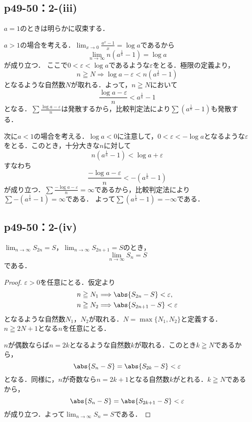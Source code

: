 \documentclass[a4paper,10pt,fleqn]{ltjsarticle}
\begin{document}
    \subsection*{p49-50：2-(iii)}

	\begin{screen}
        $a=1$のときは明らかに収束する．
  
        $a>1$の場合を考える．$\lim_{x \to 0} \frac{a^x-1}{x} = \log a$であるから
        \[
        \lim_{n \to \infty} n(a^{\frac{1}{n}}-1) = \log a
        \]
        が成り立つ．
        ここで$0 < \varepsilon <\log a$であるような$\varepsilon$をとる．極限の定義より，
        \[
         n \geqq N \Longrightarrow \log a - \varepsilon < n (a^\frac{1}{n}-1)
        \]
        となるような自然数$N$が取れる．よって，$n \geqq N$において
        \[
            \frac{\log a - \varepsilon}{n} < a^\frac{1}{n}-1
        \]
        となる．$\sum \frac{\log a - \varepsilon}{n}$は発散するから，比較判定法により$\sum (a^{\frac{1}{n}}-1)$も発散する．

        次に$ a<1$の場合を考える．$\log a <0$に注意して，$0 < \varepsilon <-\log a $となるような$\varepsilon$をとる．このとき，十分大きな$n$に対して
        \[
        n (a^\frac{1}{n}-1) < \log a + \varepsilon
        \]
        すなわち
        \[
        \frac{-\log a - \varepsilon}{n} < -(a^\frac{1}{n}-1)
        \]
        が成り立つ．$\sum \frac{-\log a - \varepsilon}{n}=\infty$であるから，比較判定法により$\sum -(a^{\frac{1}{n}}-1)=\infty$である．
        よって$\sum (a^{\frac{1}{n}}-1)=-\infty$である．
	\end{screen}


    \subsection*{p49-50：2-(iv)}


    $\lim_{n \to \infty} S_{2n}=S$，$\lim_{n \to \infty} S_{2n+1}=S$のとき，
    \[
    \lim_{n \to \infty} S_n = S
    \]
    である．

    \begin{proof}
    $\varepsilon >0$を任意にとる．仮定より
    \begin{align*} 
       &  n \geqq N_1 \Longrightarrow \abs{S_{2n}-S} < \varepsilon, \\
       & n \geqq N_2 \Longrightarrow \abs{S_{2n+1}-S} < \varepsilon
    \end{align*}
    となるような自然数$N_1$，$N_2$が取れる．$N=\max\{N_1, N_2\}$と定義する．$n \geqq 2N +1$となる$n$を任意にとる．

    $n$が偶数ならば$n =2k$となるような自然数$k$が取れる．このとき$k \geqq N$であるから，
    \[
    \abs{S_n -S}=\abs{S_{2k}-S}<\varepsilon 
    \]
    となる．同様に，$n$が奇数なら$n =2k+1$となる自然数$k$がとれる．$k \geqq N$であるから，
    \[
    \abs{S_n -S}=\abs{S_{2k+1}-S}<\varepsilon 
    \]
    が成り立つ．よって$\lim_{n \to \infty} S_n =S$である．
    \end{proof}
\end{document}

